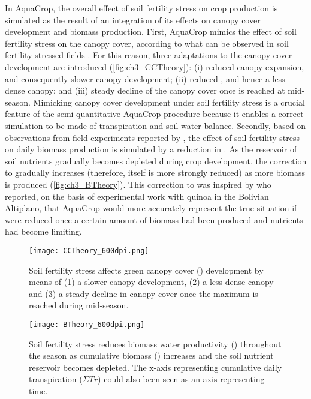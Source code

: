In AquaCrop, the overall effect of soil fertility stress on crop production is simulated as the result of an integration of its effects on canopy cover development and biomass production.  First, AquaCrop mimics the effect of soil fertility stress on the canopy cover, according to what can be observed in soil fertility stressed fields \parencite{walburg1981,albrizio2005}. For this reason, three adaptations to the canopy cover development are introduced (\autoref{fig:ch3_CCTheory}): (i) reduced canopy expansion, and consequently slower canopy development; (ii) reduced \CCx, and hence a less dense canopy; and (iii) steady decline of the canopy cover once \CCx is reached at mid-season. Mimicking canopy cover development under soil fertility stress is a crucial feature of the semi-quantitative AquaCrop procedure because it enables a correct simulation to be made of transpiration and soil water balance. Secondly, based on observations from field experiments reported by \textcite{steduto2005}, the effect of soil fertility stress on daily biomass production is simulated by a reduction in \WPster. As the reservoir of soil nutrients gradually becomes depleted during crop development, the correction to \WPster gradually increases (therefore, \WPster itself is more strongly reduced) as more biomass is produced (\autoref{fig:ch3_BTheory}). This correction to \WPster was inspired by \textcite{geerts2008b} who reported, on the basis of experimental work with quinoa in the Bolivian Altiplano, that AquaCrop would more accurately represent the true situation if \WPster were reduced once a certain amount of biomass had been produced and nutrients had become limiting. 

\begin{figure}[tbhp]
	\centering
		\texttt{[image: CCTheory\_600dpi.png]}
	\caption{Soil fertility stress affects green canopy cover (\CC) development by means of (1) a slower canopy development, (2) a less dense canopy and (3) a steady decline in canopy cover once the maximum is reached during mid-season.}
	\label{fig:ch3_CCTheory}
\end{figure}

\begin{figure}[tbhp]
	\centering
		\texttt{[image: BTheory\_600dpi.png]}
	\caption{Soil fertility stress reduces biomass water productivity (\WPster) throughout the season as cumulative biomass (\B) increases and the soil nutrient reservoir becomes depleted. The x-axis representing cumulative daily transpiration ($\Sigma Tr$) could also been seen as an axis representing time.}
	\label{fig:ch3_BTheory}
\end{figure}

